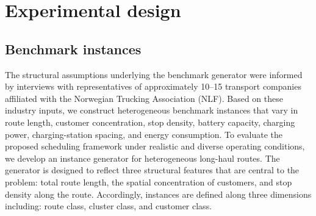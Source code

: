 \documentclass[3p,11pt,authoryear]{elsarticle}  %
\begin{document}

%











\section{Experimental design} %


\subsection{Benchmark instances}
The structural assumptions underlying the benchmark generator were informed by interviews with representatives of approximately 10--15 transport companies affiliated with the Norwegian Trucking Association (NLF). Based on these industry inputs, we construct heterogeneous benchmark instances that vary in route length, customer concentration, stop density, battery capacity, charging power, charging-station spacing, and energy consumption. To evaluate the proposed scheduling framework under realistic and diverse operating conditions, we develop an instance generator for heterogeneous long-haul routes. The generator is designed to reflect three structural features that are central to the problem: total route length, the spatial concentration of customers, and stop density along the route. Accordingly, instances are defined along three dimensions including: route class, cluster class, and customer class. 
\end{document}
